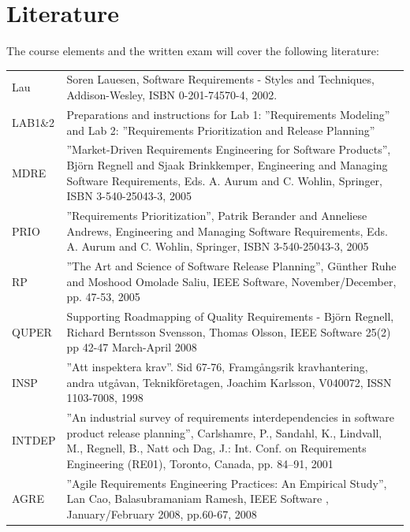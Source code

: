 \documentclass[10pt,a4paper]{article}
\begin{document}
\section{Literature}
The course elements and the written exam will cover the following literature: 
\begin{flushleft}
\setlength{\tabcolsep}{0pt}
\begin{tabular}{p{} p{}}
Lau & Soren Lauesen, Software Requirements - Styles and Techniques, Addison-Wesley, ISBN 0-201-74570-4, 2002. \\
LAB1\&2	&Preparations and instructions for Lab 1: ''Requirements Modeling'' and Lab 2: ''Requirements Prioritization and Release Planning'' \\
MDRE &	''Market-Driven Requirements Engineering for Software Products'', Björn Regnell and Sjaak Brinkkemper, Engineering and Managing Software Requirements, Eds. A. Aurum and C. Wohlin, Springer,  ISBN 3-540-25043-3, 2005 \\
PRIO&	''Requirements Prioritization'', Patrik Berander and Anneliese Andrews, Engineering and Managing Software Requirements, Eds. A. Aurum and C. Wohlin, Springer,  ISBN 3-540-25043-3, 2005 \\
 RP&	''The Art and Science of Software Release Planning'', Günther Ruhe and Moshood Omolade Saliu, IEEE Software, November/December, pp. 47-53, 2005  \\
QUPER&	Supporting Roadmapping of Quality Requirements - Björn Regnell, Richard Berntsson Svensson, 
Thomas Olsson, IEEE Software 25(2) pp 42-47 March-April 2008  \\
INSP&	''Att inspektera krav''. Sid 67-76, Framgångsrik kravhantering, andra utgåvan, Teknikföretagen, Joachim Karlsson, V040072, ISSN 1103-7008, 1998\\
 INTDEP &	''An industrial survey of requirements interdependencies in software product release planning'', Carlshamre, P., Sandahl, K., Lindvall, M., Regnell, B., Natt och Dag, J.: Int. Conf. on Requirements Engineering (RE01), Toronto, Canada, pp. 84–91, 2001 \\
AGRE &	''Agile Requirements Engineering Practices: An Empirical Study'', Lan Cao, Balasubramaniam Ramesh, IEEE Software , January/February 2008, pp.60-67, 2008 \\
\end{tabular}
\end{flushleft}
\end{document}
